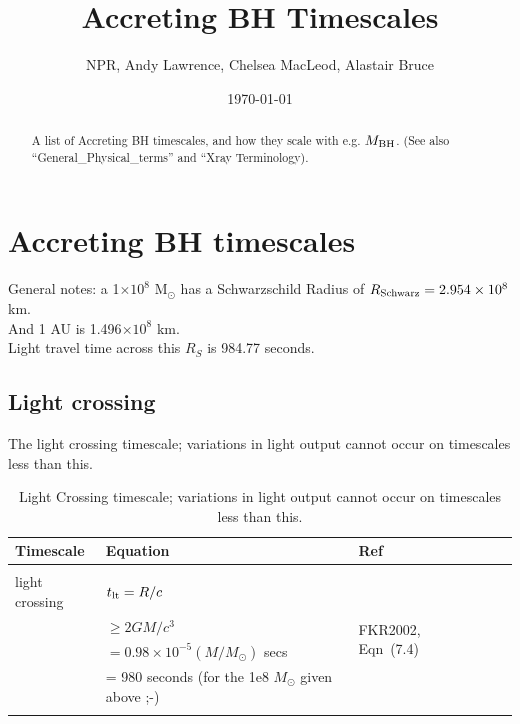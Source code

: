 \documentclass[11pt]{article}
\begin{document}
\title{Accreting BH Timescales}
\author{NPR, Andy Lawrence, Chelsea MacLeod, Alastair Bruce}
\date{\today}
\maketitle


\begin{abstract}
A list of Accreting BH timescales, and how they scale 
with e.g. $M_{\rm BH}$. 
(See also ``General\_Physical\_terms'' and ``Xray Terminology).
\end{abstract}


\section{Accreting BH timescales}
General notes: a 1$\times10^{8}$ M$_{\odot}$ has a Schwarzschild Radius of $R_{\rm
Schwarz}=2.954 \times10^{8}$ km. \\
And 1 AU is 1.496$\times10^{8}$ km.  \\ 
Light travel time across this $R_{S}$ is 984.77 seconds.


\subsection{Light crossing}
The light crossing timescale; variations in light output cannot occur on timescales less than this.

\begin{table}
  \begin{center}
    \begin{tabular}{l l l l l l} 
      \hline
      \hline 
      Timescale         &     Equation    &  Ref  \\
      \hline  
       &&& \\
       light crossing  &  {\boldmath $t_{\rm lt} = R/c$}       &  \multirow{4}{*}{FKR2002, Eqn~(7.4) }      \\
                               &   $ \geq 2GM /c^{3}$                                 &  \\
                               &  $= 0.98\times10^{-5} (M/M_{\odot})$ secs   &  \\
                                &   = 980 seconds (for the 1e8 $M_{\odot}$ given above ;-) & \\ 
        &&& \\
         \hline
         \hline 
       \end{tabular}
      \caption{Light Crossing timescale; variations in light output cannot occur on timescales less than this.}
      \label{tab:lightcrossing}
    \end{center}
\end{table}
\end{document}
